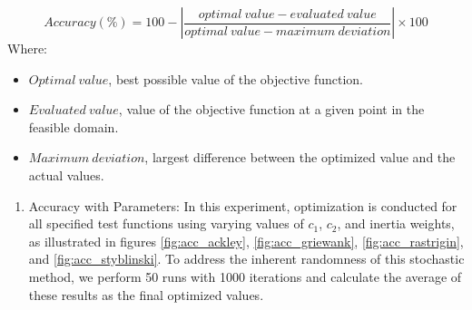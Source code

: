 \documentclass[paper,revised]{geophysics}
\begin{document}
\begin{equation}
	Accuracy (\%) = 100 - \left| \frac{optimal \ value - evaluated \ value}{optimal \ value - maximum \ deviation} \right| \times 100
	\label{eqn:accuracy}
\end{equation}
Where:
\begin{itemize}
	\item \(Optimal \  value\), best possible value of the objective function.
	\item \(Evaluated \ value\), value of the objective function at a given point in the feasible domain.
	\item \(Maximum \ deviation\), largest difference between the optimized value and the actual values.
\end{itemize}
\begin{enumerate}
	\item Accuracy with Parameters: In this experiment, optimization is conducted for all specified test functions using varying values of \(c_1\), \(c_2\), and inertia weights, as illustrated in figures \ref{fig:acc_ackley}, \ref{fig:acc_griewank}, \ref{fig:acc_rastrigin}, and \ref{fig:acc_styblinski}. To address the inherent randomness of this stochastic method, we perform 50 runs with 1000 iterations and calculate the average of these results as the final optimized values. 
	

\end{enumerate}
\end{document}
